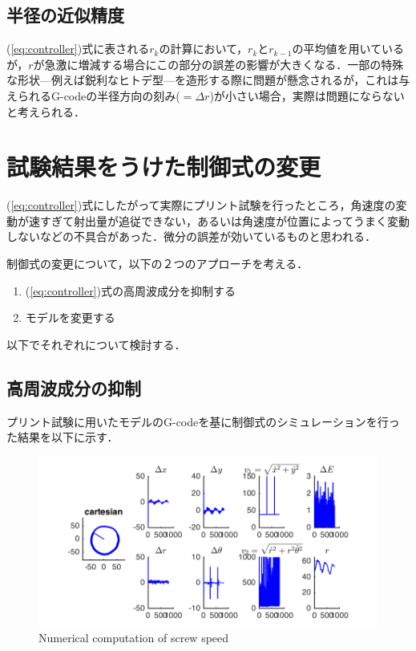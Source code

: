 \documentclass[twocolumn,oneside,a4paper]{article}
\begin{document}
\subsection{半径の近似精度} 
(\ref{eq:controller})式に表される$r_k$の計算において，$r_k$と$r_{k-1}$の平均値を用いているが，$r$が急激に増減する場合にこの部分の誤差の影響が大きくなる．一部の特殊な形状—例えば鋭利なヒトデ型—を造形する際に問題が懸念されるが，これは与えられるG-codeの半径方向の刻み($ = \Delta r$)が小さい場合，実際は問題にならないと考えられる．


\section{試験結果をうけた制御式の変更}
(\ref{eq:controller})式にしたがって実際にプリント試験を行ったところ，角速度の変動が速すぎて射出量が追従できない，あるいは角速度が位置によってうまく変動しないなどの不具合があった．微分の誤差が効いているものと思われる．

制御式の変更について，以下の２つのアプローチを考える．

\begin{enumerate}
	\item (\ref{eq:controller})式の高周波成分を抑制する
	\item モデルを変更する
\end{enumerate}

以下でそれぞれについて検討する．
\subsection{高周波成分の抑制}
プリント試験に用いたモデルのG-codeを基に制御式のシミュレーションを行った結果を以下に示す．

\begin{figure}[htbp]
    \includegraphics[bb=0 0 432 216,width=1\columnwidth]{gcodesim.png}
    \caption{Numerical computation of screw speed}
    \label{fig:noise}
\end{figure}
\end{document}
